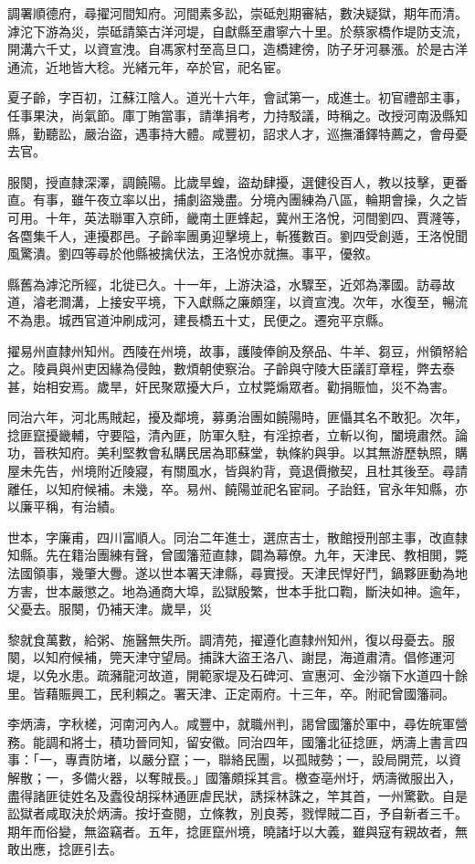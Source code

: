 \begin{pinyinscope}
調署順德府，尋擢河間知府。河間素多訟，崇砥剋期審結，數決疑獄，期年而清。滹沱下游為災，崇砥請築古洋河堤，自獻縣至肅寧六十里。於蔡家橋作堤防支流，開溝六千丈，以資宣洩。自馮家村至高旦口，造橋建徬，防子牙河暴漲。於是古洋通流，近地皆大稔。光緒元年，卒於官，祀名宦。

夏子齡，字百初，江蘇江陰人。道光十六年，會試第一，成進士。初官禮部主事，任事果決，尚氣節。庫丁賄當事，請準捐考，力持駁議，時稱之。改授河南汲縣知縣，勤聽訟，嚴治盜，遇事持大體。咸豐初，詔求人才，巡撫潘鐸特薦之，會母憂去官。

服闋，授直隸深澤，調饒陽。比歲旱蝗，盜劫肆擾，選健役百人，教以技擊，更番直。有事，雖午夜立率以出，捕劇盜幾盡。分境內團練為八區，輪期會操，久之皆可用。十年，英法聯軍入京師，畿南土匪蜂起，冀州王洛悅，河間劉四、賈漋等，各麕集千人，連擾郡邑。子齡率團勇迎擊境上，斬獲數百。劉四受創遁，王洛悅聞風驚潰。劉四等尋於他縣被擒伏法，王洛悅亦就撫。事平，優敘。

縣舊為滹沱所經，北徙已久。十一年，上游決溢，水驟至，近郊為澤國。訪尋故道，濬老澗溝，上接安平境，下入獻縣之廉頗窪，以資宣洩。次年，水復至，暢流不為患。城西官道沖刷成河，建長橋五十丈，民便之。遷宛平京縣。

擢易州直隸州知州。西陵在州境，故事，護陵俸餉及祭品、牛羊、芻豆，州領帑給之。陵員與州吏因緣為侵蝕，數煩朝使察治。子齡與守陵大臣議訂章程，弊去泰甚，始相安焉。歲旱，奸民聚眾擾大戶，立杖斃煽眾者。勸捐賑恤，災不為害。

同治六年，河北馬賊起，擾及鄰境，募勇治團如饒陽時，匪懾其名不敢犯。次年，捻匪竄擾畿輔，守要隘，清內匪，防軍久駐，有淫掠者，立斬以徇，闔境肅然。論功，晉秩知府。美利堅教會私購民居為耶蘇堂，執條約與爭。以其無游歷執照，購屋未先告，州境附近陵寢，有關風水，皆與約背，竟退價撤契，且杜其後至。尋請離任，以知府候補。未幾，卒。易州、饒陽並祀名宦祠。子詒鈺，官永年知縣，亦以廉平稱，有治績。

世本，字廉甫，四川富順人。同治二年進士，選庶吉士，散館授刑部主事，改直隸知縣。先在籍治團練有聲，曾國籓蒞直隸，闢為幕僚。九年，天津民、教相閧，斃法國領事，幾肇大釁。遂以世本署天津縣，尋實授。天津民悍好鬥，鍋夥匪動為地方害，世本嚴懲之。地為通商大埠，訟獄殷繁，世本手批口鞫，斷決如神。逾年，父憂去。服闋，仍補天津。歲旱，災

黎就食萬數，給粥、施醫無失所。調清苑，擢遵化直隸州知州，復以母憂去。服闋，以知府候補，筦天津守望局。捕誅大盜王洛八、謝昆，海道肅清。倡修運河堤，以免水患。疏瀦龍河故道，開範家堤及石碑河、宣惠河、金沙嶺下水道四十餘里。皆藉賑興工，民利賴之。署天津、正定兩府。十三年，卒。附祀曾國籓祠。

李炳濤，字秋槎，河南河內人。咸豐中，就職州判，謁曾國籓於軍中，尋佐皖軍營務。能調和將士，積功晉同知，留安徽。同治四年，國籓北征捻匪，炳濤上書言四事：「一，專責防堵，以嚴分竄；一，聯絡民團，以孤賊勢；一，設局開荒，以資解散；一，多備火器，以奪賊長。」國籓頗採其言。檄查亳州圩，炳濤微服出入，盡得諸匪徒姓名及蠹役胡採林通匪虐民狀，誘採林誅之，竿其首，一州驚歡。自是訟獄者咸取決於炳濤。按圩查閱，立條教，別良莠，戮悍賊二百，予自新者三千。期年而俗變，無盜竊者。五年，捻匪竄州境，曉諸圩以大義，雖與寇有親故者，無敢出應，捻匪引去。


\end{pinyinscope}
